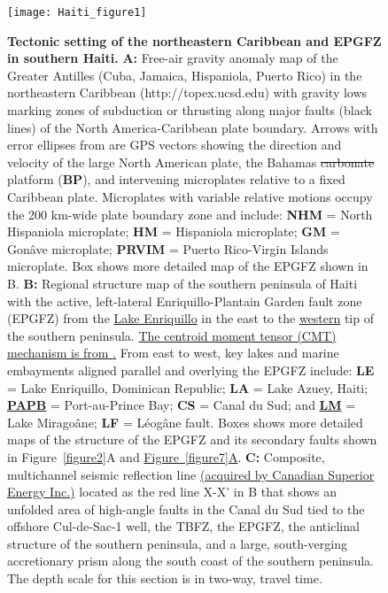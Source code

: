 \documentclass[linenumbers,draft]{agujournal}
\begin{document}
\begin{figure}
\centering
\texttt{[image: Haiti\_figure1]}
\caption{\textbf{Tectonic setting of the northeastern Caribbean and EPGFZ in southern Haiti.} \textbf{A:}
Free-air gravity anomaly map of the Greater Antilles (Cuba, Jamaica, Hispaniola, Puerto Rico) in the northeastern Caribbean (http://topex.ucsd.edu) with gravity lows marking zones of subduction or thrusting along major faults (black lines) of the North America-Caribbean plate boundary. Arrows with error ellipses from \citet{calais2010transpressional} are GPS vectors showing the direction and velocity of the large North American plate, the Bahamas \st{carbonate} platform (\textbf{BP}), and intervening microplates relative to a fixed Caribbean plate. Microplates with variable relative motions occupy the 200 km-wide plate boundary zone and include: \textbf{NHM} = North Hispaniola microplate; \textbf{HM} = Hispaniola microplate; \textbf{GM} = Gon\^ave microplate; \textbf{PRVIM} = Puerto Rico-Virgin Islands microplate. Box shows more detailed map of the EPGFZ shown in B. \textbf{B:} Regional structure map of the southern peninsula of Haiti with the active, left-lateral Enriquillo-Plantain Garden fault zone (EPGFZ) from the \underline{Lake Enriquillo} in the east to the \ul{western} tip of the southern peninsula. \underline{The centroid moment tensor (CMT) mechanism is from \citet{douilly2013crustal}.} From east to west, key lakes and marine embayments aligned parallel and overlying the EPGFZ include: \textbf{LE} = Lake Enriquillo, Dominican Republic; \textbf{LA} = Lake Azuey, Haiti; \textbf{\ul{PAPB}} = Port-au-Prince Bay; \textbf{CS }= Canal du Sud; and \textbf{\ul{LM}} = Lake Mirago\^ane; \textbf{LF} = L\'eog\^ane fault. Boxes shows more detailed maps of the structure of the EPGFZ and its secondary faults shown in Figure~\ref{figure2}A and \underline{Figure~\ref{figure7}A}. \textbf{C:} Composite, multichannel seismic reflection line \ul{(acquired by Canadian Superior Energy Inc.)} located as the red line X-X' in B that shows an unfolded area of high-angle faults in the Canal du Sud tied to the offshore Cul-de-Sac-1 well, the TBFZ, the EPGFZ, the anticlinal structure of the southern peninsula, and a large, south-verging accretionary prism along the south coast of the southern peninsula. The depth scale for this section is in two-way, travel time.}
\label{figure1}
\end{figure}
\end{document}
